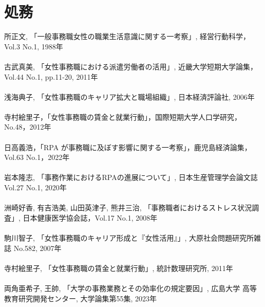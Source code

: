 \section*{処務}
所正文, 「一般事務職女性の職業生活意識に関する一考察」, 経営行動科学，Vol.3 No.1, 1988年
\\\\
古武真美, 「女性事務職における派遣労働者の活用」, 近畿大学短期大学論集，Vol.44 No.1, pp.11-20, 2011年
\\\\
浅海典子, 「女性事務職のキャリア拡大と職場組織」, 日本経済評論社, 2006年
\\\\
寺村絵里子，「女性事務職の賃金と就業行動」，国際短期大学人口学研究，No.48，2012年
\\\\
日高義浩，「RPA が事務職に及ぼす影響に関する一考察」，鹿児島経済論集，Vol.63 No.1，2022年
\\\\
岩本隆志, 「事務作業におけるRPAの進展について」, 日本生産管理学会論文誌Vol.27 No.1, 2020年
\\\\
洲崎好香, 有吉浩美, 山田英津子, 熊井三治, 「事務職者におけるストレス状況調査」, 日本健康医学協会誌，Vol.17 No.1, 2008年
\\\\
駒川智子, 「女性事務職のキャリア形成と『女性活用』」, 大原社会問題研究所雑誌 No.582, 2007年
\\\\
寺村絵里子, 「女性事務職の賃金と就業行動」, 統計数理研究所, 2011年
\\\\
両角亜希子, 王帥, 「大学の事務業務とその効率化の規定要因」, 広島大学 高等教育研究開発センター, 大学論集第55集, 2023年

\clearpage
